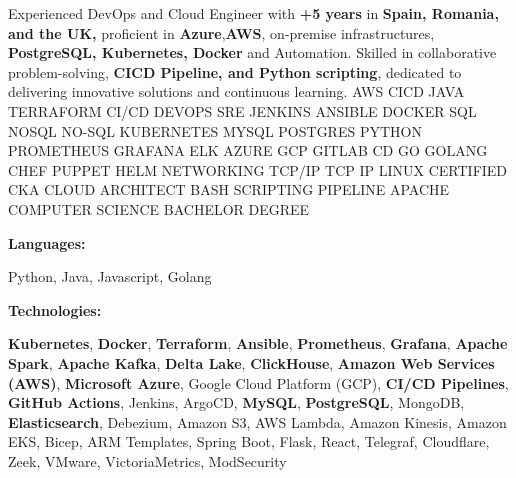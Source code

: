 \documentclass[9pt]{developercv} %
\begin{document}
\begin{minipage}[t]{0.46\textwidth}
    \vspace{-6pt}

    {Experienced DevOps and Cloud Engineer with \textbf{+5 years} in \textbf{Spain,
            Romania, and the UK,} proficient in \textbf{Azure},\textbf{AWS}, on-premise
        infrastructures, \textbf{PostgreSQL, Kubernetes, Docker} and Automation.
        Skilled in collaborative problem-solving, \textbf{CICD
            Pipeline, and Python scripting}, dedicated to delivering
        innovative solutions and continuous learning.}
    {\color{white}\tiny AWS CICD JAVA TERRAFORM CI/CD DEVOPS SRE JENKINS ANSIBLE DOCKER SQL NOSQL NO-SQL KUBERNETES MYSQL POSTGRES PYTHON PROMETHEUS GRAFANA ELK AZURE GCP GITLAB CD GO GOLANG CHEF PUPPET HELM NETWORKING TCP/IP TCP IP LINUX CERTIFIED CKA CLOUD ARCHITECT BASH SCRIPTING PIPELINE APACHE COMPUTER SCIENCE BACHELOR DEGREE  }
\end{minipage}
\hfill %
\begin{minipage}[t]{0.465\textwidth}
    \vspace{-6pt}

    \begin{minipage}[t]{0.2\textwidth}
        \textbf{Languages:}
    \end{minipage}
    \hfill
    \begin{minipage}[t]{0.72\textwidth}
        Python, Java, Javascript, Golang
    \end{minipage}
    \vspace{4mm}

    \begin{minipage}[t]{0.2\textwidth}
        \textbf{Technologies:}
    \end{minipage}
    \hfill
    \begin{minipage}[t]{0.73\textwidth}
        {\footnotesize
        \textbf{Kubernetes}, \textbf{Docker}, \textbf{Terraform}, \textbf{Ansible}, \textbf{Prometheus}, \textbf{Grafana}, \textbf{Apache Spark}, \textbf{Apache Kafka}, \textbf{Delta Lake}, \textbf{ClickHouse}, \textbf{Amazon Web Services (AWS)}, \textbf{Microsoft Azure}, Google Cloud Platform (GCP), \textbf{CI/CD Pipelines}, \textbf{GitHub Actions}, Jenkins, ArgoCD, \textbf{MySQL}, \textbf{PostgreSQL}, MongoDB, \textbf{Elasticsearch}, Debezium, Amazon S3, AWS Lambda, Amazon Kinesis, Amazon EKS, Bicep, ARM Templates, Spring Boot, Flask, React, Telegraf, Cloudflare, Zeek, VMware, VictoriaMetrics, ModSecurity
        }
    \end{minipage}

\end{minipage}
\end{document}
